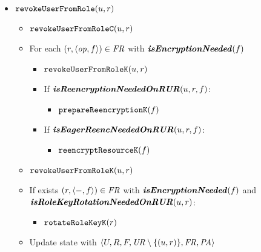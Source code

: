 {\begin{itemize}
        \item \( \mathtt{revokeUserFromRole}(u, r) \)
        \begin{itemize}
            \item \( \mathtt{revokeUserFromRole}\mathtt{C}(u, r) \)
            \item For each \( (r, \langle \mathit{op}, \allowbreak f \rangle) \in \mathit{FR} \) with \( \textbf{\textit{isEncryptionNeeded}}(f) \)
            \begin{itemize}
                \item \( \mathtt{revokeUserFromRole}\mathtt{K}(u, r) \)
                \item If \( \textbf{\textit{isReencryptionNeededOnRUR}}(u, r, f) \):
                \begin{itemize}
                    \item \( \mathtt{prepareReencryption\mathtt{K}}(f) \)
                \end{itemize}
                \item If \( \textbf{\textit{isEagerReencNeededOnRUR}}(u, r, f) \):
                \begin{itemize}
                    \item \( \mathtt{reencryptResource\mathtt{K}}(f) \)
                \end{itemize}
            \end{itemize}
            \item \( \mathtt{revokeUserFromRole}\mathtt{K}(u, r) \)
            \item If exists \( (r, \langle -, \allowbreak f \rangle) \in \mathit{FR} \) with \( \textbf{\textit{isEncryptionNeeded}}(f) \) and \( \textbf{\textit{isRoleKeyRotationNeededOnRUR}}(u, r) \):
            \begin{itemize}
                \item \( \mathtt{rotateRoleKey\mathtt{K}}(r) \)
            \end{itemize}
            \item Update state with \( \langle U, \allowbreak R, \allowbreak F, \allowbreak \mathit{UR} \setminus \lbrace (u, r) \rbrace, \allowbreak \mathit{FR}, \allowbreak \mathit{PA} \rangle \)
        \end{itemize}


\end{itemize}}
